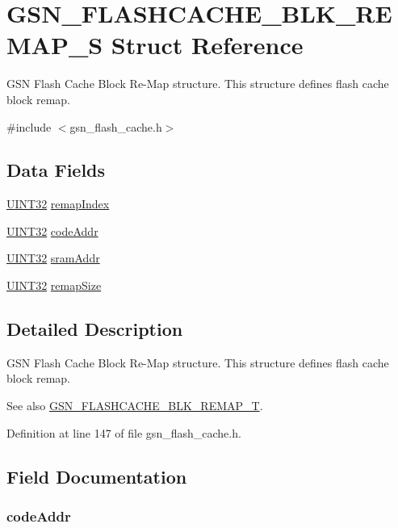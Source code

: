 \hypertarget{a00074}{
\section{GSN\_\-FLASHCACHE\_\-BLK\_\-REMAP\_\-S Struct Reference}
\label{a00074}
}


GSN Flash Cache Block Re-\/Map structure. This structure defines flash cache block remap.  




{\ttfamily \#include $<$gsn\_\-flash\_\-cache.h$>$}

\subsection*{Data Fields}
\begin{DoxyCompactItemize}
\item 
\hyperlink{a00660_gae1e6edbbc26d6fbc71a90190d0266018}{UINT32} \hyperlink{a00074_a315c43ae7f3a96179716b2564ca9a0f4}{remapIndex}
\item 
\hyperlink{a00660_gae1e6edbbc26d6fbc71a90190d0266018}{UINT32} \hyperlink{a00074_a04c64993d3ab6f821ec2dfb8d8b84163}{codeAddr}
\item 
\hyperlink{a00660_gae1e6edbbc26d6fbc71a90190d0266018}{UINT32} \hyperlink{a00074_a6b728d16c94f762108480a6f8f1e211c}{sramAddr}
\item 
\hyperlink{a00660_gae1e6edbbc26d6fbc71a90190d0266018}{UINT32} \hyperlink{a00074_a9768b2fadf3fc72ea46325f64345ecb7}{remapSize}
\end{DoxyCompactItemize}


\subsection{Detailed Description}
GSN Flash Cache Block Re-\/Map structure. This structure defines flash cache block remap. 

\begin{DoxySeeAlso}{See also}
\hyperlink{a00646_gaae9fda1c44c958d868f7cf116897bfc5}{GSN\_\-FLASHCACHE\_\-BLK\_\-REMAP\_\-T}. 
\end{DoxySeeAlso}


Definition at line 147 of file gsn\_\-flash\_\-cache.h.



\subsection{Field Documentation}
\hypertarget{a00074_a04c64993d3ab6f821ec2dfb8d8b84163}{
\subsubsection[{codeAddr}]{ {\bf codeAddr}}}
\label{a00074_a04c64993d3ab6f821ec2dfb8d8b84163}


